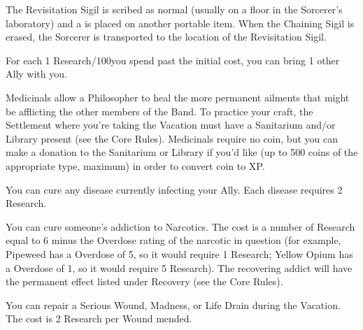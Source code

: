 {The Revisitation Sigil is scribed as normal (usually on a floor in the Sorcerer's laboratory) and a  is placed on another portable item.  When the Chaining Sigil is erased, the Sorcerer is transported to the location of the Revisitation Sigil.  

For each 1 Research/100\AU you spend past the initial cost, you can bring 1 other Ally with you.

\newpage


Medicinals allow a Philosopher to heal the more permanent ailments that might be afflicting the other members of the Band.   To practice your craft, the Settlement where you're taking the Vacation must have a Sanitarium and/or Library present (see the Core Rules).  Medicinals require no coin, but you can make a donation to the Sanitarium or Library if you'd like (up to 500 coins of the appropriate type, maximum) in order to convert coin to XP.



You can cure any disease currently infecting your Ally.  Each disease requires 2 Research.




You can cure someone's addiction to Narcotics.  The cost is a number of Research equal to 6 minus the \MAX Overdose rating of the narcotic in question (for example, Pipeweed has a \MAX Overdose of 5, so it would require 1 Research; Yellow Opium has a \MAX Overdose of 1, so it would require 5 Research).  The recovering addict will have the permanent effect listed under Recovery (see the Core Rules).




You can repair a Serious Wound, Madness, or Life Drain during the Vacation.  The cost is 2 Research per Wound mended.




}%
